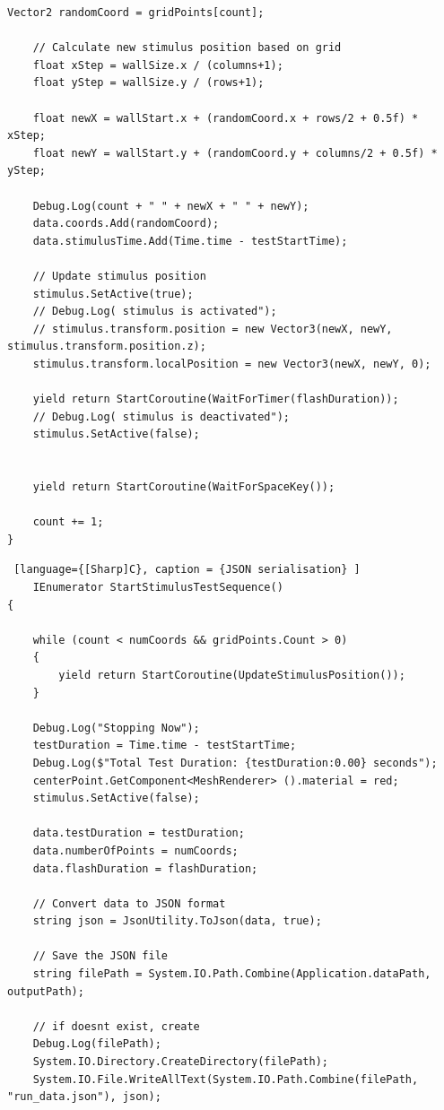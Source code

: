 \documentclass{l4proj}
\begin{document}
\begin{appendices}
\begin{lstlisting}[language={[Sharp]C}, caption = {Function that updates the stimulus coordinate} ]
    Vector2 randomCoord = gridPoints[count];

    // Calculate new stimulus position based on grid
    float xStep = wallSize.x / (columns+1);
    float yStep = wallSize.y / (rows+1);

    float newX = wallStart.x + (randomCoord.x + rows/2 + 0.5f) * xStep;
    float newY = wallStart.y + (randomCoord.y + columns/2 + 0.5f) * yStep;

    Debug.Log(count + " " + newX + " " + newY);
    data.coords.Add(randomCoord);
    data.stimulusTime.Add(Time.time - testStartTime);
    
    // Update stimulus position
    stimulus.SetActive(true);
    // Debug.Log( stimulus is activated");
    // stimulus.transform.position = new Vector3(newX, newY, stimulus.transform.position.z);
    stimulus.transform.localPosition = new Vector3(newX, newY, 0);

    yield return StartCoroutine(WaitForTimer(flashDuration));
    // Debug.Log( stimulus is deactivated");
    stimulus.SetActive(false);
    

    yield return StartCoroutine(WaitForSpaceKey());

    count += 1;
}
\end{lstlisting}

\begin{lstlisting} [language={[Sharp]C}, caption = {JSON serialisation} ]
    IEnumerator StartStimulusTestSequence()
{
    
    while (count < numCoords && gridPoints.Count > 0)
    {
        yield return StartCoroutine(UpdateStimulusPosition());
    }

    Debug.Log("Stopping Now");
    testDuration = Time.time - testStartTime;
    Debug.Log($"Total Test Duration: {testDuration:0.00} seconds");
    centerPoint.GetComponent<MeshRenderer> ().material = red;
    stimulus.SetActive(false);
    
    data.testDuration = testDuration;
    data.numberOfPoints = numCoords;
    data.flashDuration = flashDuration;

    // Convert data to JSON format
    string json = JsonUtility.ToJson(data, true);

    // Save the JSON file
    string filePath = System.IO.Path.Combine(Application.dataPath, outputPath);

    // if doesnt exist, create
    Debug.Log(filePath);
    System.IO.Directory.CreateDirectory(filePath);
    System.IO.File.WriteAllText(System.IO.Path.Combine(filePath, "run_data.json"), json);


\end{lstlisting}
\end{appendices}
\end{document}
